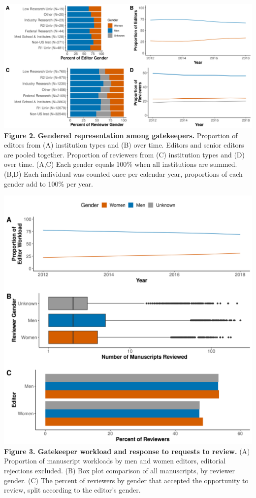 \documentclass[11pt,]{article}
\begin{document}
\newpage

\includegraphics{Figure_2.png} \textbf{Figure 2. Gendered representation
among gatekeepers.} Proportion of editors from (A) institution types and
(B) over time. Editors and senior editors are pooled together.
Proportion of reviewers from (C) institution types and (D) over time.
(A,C) Each gender equals 100\% when all institutions are summed.(B,D)
Each individual was counted once per calendar year, proportions of each
gender add to 100\% per year.

\newpage

\includegraphics{Figure_3.png} \textbf{Figure 3. Gatekeeper workload and
response to requests to review.} (A) Proportion of manuscript workloads
by men and women editors, editorial rejections excluded. (B) Box plot
comparison of all manuscripts, by reviewer gender. (C) The percent of
reviewers by gender that accepted the opportunity to review, split
according to the editor's gender.
\end{document}
